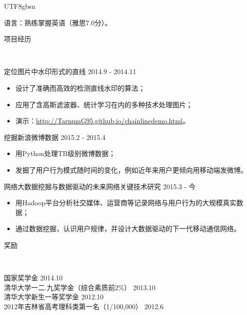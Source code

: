 \documentclass[9pt]{article}
\newenvironment{changemargin}[2]{%
  \begin{list}{}{%
    \setlength{\topsep}{0pt}%
    \setlength{\leftmargin}{#1}%
    \setlength{\rightmargin}{#2}%
    \setlength{\listparindent}{\parindent}%
    \setlength{\itemindent}{\parindent}%
    \setlength{\parsep}{\parskip}%
  }%
  \item[]}{\end{list}
}
\newcommand{\lineover}{
    \begin{changemargin}{-0.05in}{-0.05in}
        \vspace*{-8pt}
        \hrulefill \\
        \vspace*{-2pt}
    \end{changemargin}
}
\newcommand{\header}[1]{
    \begin{changemargin}{-0.5in}{-0.5in}
        \scshape{#1}\\
    \lineover
    \end{changemargin}
}
\newenvironment{body} {
    \vspace*{-16pt}
    \begin{changemargin}{-0.25in}{-0.5in}
  } 
    {\end{changemargin}
}
\begin{document}
\begin{CJK*}{UTF8}{gbsn}
\begin{body}
    语言：熟练掌握英语（雅思7.0分）。\\
\end{body}
\smallskip
\smallskip
\smallskip

\header{项目经历}

\begin{body}
    \vspace{14pt}
    定位图片中水印形式的直线 \hfill 2014.9 - 2014.11
    \begin{itemize}
    \itemsep 0pt
    \item 设计了准确而高效的检测直线水印的算法；
    \item 应用了含高斯滤波器、统计学习在内的多种技术处理图片；
    \item 演示：\href{http://TarnumG95.github.io/chainlinedemo.html}{http://TarnumG95.github.io/chainlinedemo.html}。
    \end{itemize}
    \smallskip
    挖掘新浪微博数据 \hfill 2015.2 - 2015.4
    \begin{itemize}
    \itemsep 0pt
    \item 用Python处理TB级别微博数据；
    \item 发掘了用户行为模式随时间的变化，例如近年来用户更倾向用移动端发微博。
    \end{itemize}
    \smallskip
网络大数据挖掘与数据驱动的未来网络关键技术研究 \hfill 2015.3 - 今
    \begin{itemize}
    \itemsep 0pt
    \item 用Hadoop平台分析社交媒体、运营商等记录网络与用户行为的大规模真实数据；
    \item 通过数据挖掘，认识用户规律，并设计大数据驱动的下一代移动通信网络。
    \end{itemize}
    \smallskip

\end{body}
\smallskip
\smallskip

\header{奖励}

\begin{body}
    \vspace{14pt}
    国家奖学金 \hfill{} 2014.10\\
    \smallskip
    清华大学一二.九奖学金（综合素质前2\%） \hfill{} 2013.10\\
    \smallskip
    清华大学新生一等奖学金 \hfill{} 2012.10\\
    \smallskip
    2012年吉林省高考理科类第一名（1/100,000） \hfill{} 2012.6
\end{body}


\end{CJK*}
\end{document}
